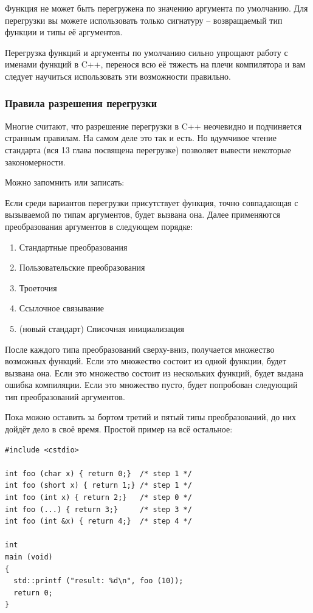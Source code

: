 \documentclass[a4paper,12pt,oneside]{article}
\begin{document}
Функция не может быть перегружена по значению аргумента по умолчанию. Для перегрузки вы можете использовать только сигнатуру – возвращаемый тип функции и типы её аргументов.

Перегрузка функций и аргументы по умолчанию сильно упрощают работу с именами функций в C++, перенося всю её тяжесть на плечи компилятора и вам следует научиться использовать эти возможности правильно.

\subsubsection{Правила разрешения перегрузки}\label{Overloading}

Многие считают, что разрешение перегрузки в C++ неочевидно и подчиняется странным правилам. На самом деле это так и есть. Но вдумчивое чтение стандарта (вся 13 глава посвящена перегрузке) позволяет вывести некоторые закономерности. 

Можно запомнить или записать:

Если среди вариантов перегрузки присутствует функция, точно совпадающая с вызываемой по типам аргументов, будет вызвана она. Далее применяются преобразования аргументов в следующем порядке:

\begin{enumerate}
\item Стандартные преобразования
\item Пользовательские преобразования
\item Троеточия
\item Ссылочное связывание
\item (новый стандарт) Списочная инициализация
\end{enumerate}

После каждого типа преобразований сверху-вниз, получается множество возможных функций. Если это множество состоит из одной функции, будет вызвана она. Если это множество состоит из нескольких функций, будет выдана ошибка компиляции. Если это множество пусто, будет попробован следующий тип преобразований аргументов.

Пока можно оставить за бортом третий и пятый типы преобразований, до них дойдёт дело в своё время. Простой пример на всё остальное:

\begin{lstlisting}
#include <cstdio>

int foo (char x) { return 0;}  /* step 1 */
int foo (short x) { return 1;} /* step 1 */
int foo (int x) { return 2;}   /* step 0 */
int foo (...) { return 3;}     /* step 3 */
int foo (int &x) { return 4;}  /* step 4 */

int
main (void)
{
  std::printf ("result: %d\n", foo (10));
  return 0;
}
\end{lstlisting}
\end{document}
